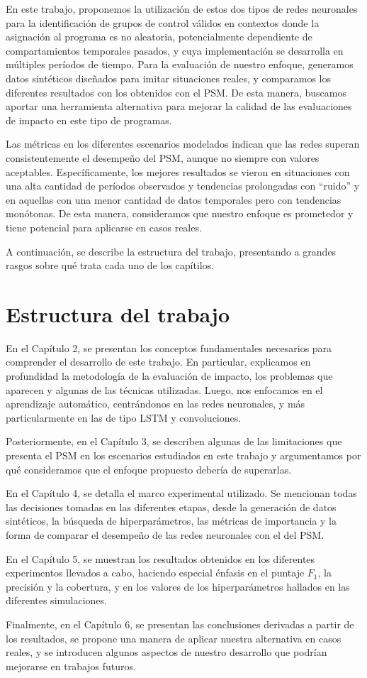 \documentclass[../main.tex]{subfiles}
\begin{document}
En este trabajo, proponemos la utilización de estos dos tipos de redes neuronales para la
identificación de grupos de control válidos en contextos donde la asignación al programa
es no aleatoria, potencialmente dependiente de compartamientos temporales pasados, y cuya
implementación se desarrolla en múltiples períodos de tiempo. Para la evaluación de
nuestro enfoque, generamos datos sintéticos diseñados para imitar situaciones reales, y
comparamos los diferentes resultados con los obtenidos con el PSM. De esta manera,
buscamos aportar una herramienta alternativa para mejorar la calidad de las evaluaciones
de impacto en este tipo de programas.

Las métricas en los diferentes escenarios modelados indican que las redes superan
consistentemente el desempeño del PSM, aunque no siempre con valores aceptables.
Específicamente, los mejores resultados se vieron en situaciones con una alta cantidad de
períodos observados y tendencias prolongadas con ``ruido'' y en aquellas con una menor
cantidad de datos temporales pero con tendencias monótonas. De esta manera, consideramos
que nuestro enfoque es prometedor y tiene potencial para aplicarse en casos reales.

A continuación, se describe la estructura del trabajo, presentando a grandes rasgos
sobre qué trata cada uno de los capítilos.

\section{Estructura del trabajo}
En el Capítulo 2, se presentan los conceptos fundamentales necesarios para comprender el
desarrollo de este trabajo. En particular, explicamos en profundidad la metodología de la
evaluación de impacto, los problemas que aparecen y algunas de las técnicas utilizadas.
Luego, nos enfocamos en el aprendizaje automático, centrándonos en las redes neuronales, y
más particularmente en las de tipo LSTM y convoluciones.

Posteriormente, en el Capítulo 3, se describen algunas de las limitaciones que presenta el
PSM en los escenarios estudiados en este trabajo y argumentamos por qué consideramos que
el enfoque propuesto debería de superarlas.

En el Capítulo 4, se detalla el marco experimental utilizado. Se mencionan todas las
decisiones tomadas en las diferentes etapas, desde la generación de datos sintéticos, la
búsqueda de hiperparámetros, las métricas de importancia y la forma de comparar el
desempeño de las redes neuronales con el del PSM.

En el Capítulo 5, se muestran los resultados obtenidos en los diferentes experimentos
llevados a cabo, haciendo especial énfasis en el puntaje \(F_1\), la precisión y la
cobertura, y en los valores de los hiperparámetros hallados en las diferentes
simulaciones.

Finalmente, en el Capítulo 6, se presentan las conclusiones derivadas a partir de los
resultados, se propone una manera de aplicar nuestra alternativa en casos reales, y se
introducen algunos aspectos de nuestro desarrollo que podrían mejorarse en trabajos
futuros.
\end{document}
